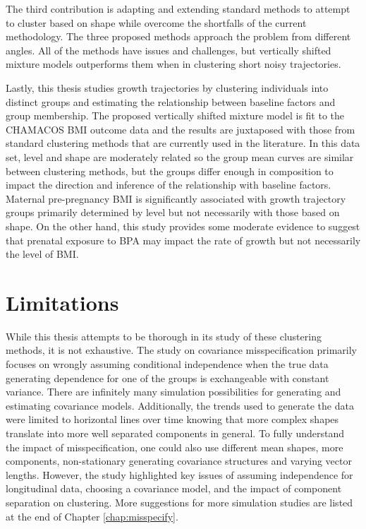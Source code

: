 The third contribution is adapting and extending standard methods to attempt to cluster based on shape while overcome the shortfalls of the current methodology. The three proposed methods approach the problem from different angles. All of the methods have issues and challenges, but vertically shifted mixture models outperforms them when in clustering short noisy trajectories.

Lastly, this thesis studies growth trajectories by clustering individuals into distinct groups and estimating the relationship between baseline factors and group membership. The proposed vertically shifted mixture model is fit to the CHAMACOS BMI outcome data and the results are juxtaposed with those from standard clustering methods that are currently used in the literature. In this data set, level and shape are moderately related so the group mean curves are similar between clustering methods, but the groups differ enough in composition to impact the direction and inference of the relationship with baseline factors. Maternal pre-pregnancy BMI is significantly associated with growth trajectory groups primarily determined by level but not necessarily with those based on shape. On the other hand, this study provides some moderate evidence to suggest that prenatal exposure to BPA may impact the rate of growth but not necessarily the level of BMI.

\section{Limitations}
While this thesis attempts to be thorough in its study of these clustering methods, it is not exhaustive. The study on covariance misspecification primarily focuses on wrongly assuming conditional independence when the true data generating dependence for one of the groups is exchangeable with constant variance. There are infinitely many simulation possibilities for generating and estimating covariance models. Additionally, the trends used to generate the data were limited to horizontal lines over time knowing that more complex shapes translate into more well separated components in general. To fully understand the impact of misspecification, one could also use different mean shapes, more components, non-stationary generating covariance structures and varying vector lengths. However, the study highlighted key issues of assuming independence for longitudinal data, choosing a covariance model, and the impact of component separation on clustering. More suggestions for more simulation studies are listed at the end of Chapter \ref{chap:misspecify}. 

